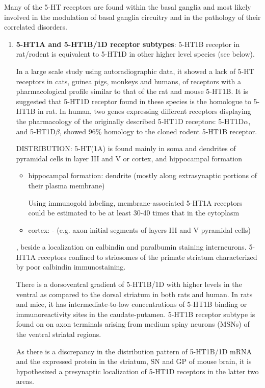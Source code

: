 Many of the 5-HT receptors are found within the basal ganglia and most likely
involved in the modulation of basal ganglia circuitry and in the pathology of
their correlated disorders.
\begin{enumerate}
  \item  {\bf 5-HT1A and 5-HT1B/1D receptor subtypes}: 5-HT1B receptor in
  rat/rodent is equivalent to 5-HT1D in other higher level species (see below).

In a large scale study using autoradiographic data, it showed a lack of 5-HT
receptors in cats, guinea pigs, monkeys and humans, of receptors with a
pharmacological profile similar to that of the rat and mouse 5-HT1B.
It is suggested that 5-HT1D receptor found in these species is the homologue to
5-HT1B in rat. In human, two genes expressing different receptors displaying the
pharmacology of the originally described 5-HT1D receptors: 5-HT1D$\alpha$, and
5-HT1D$\beta$, showed 96\% homology to the cloned rodent 5-HT1B receptor.


DISTRIBUTION:   5-HT(1A) is found mainly in soma and dendrites of pyramidal
cells in layer III and V or cortex, and hippocampal formation
  \begin{itemize}
    \item hippocampal formation: dendrite (mostly along extrasynaptic portions
    of their plasma membrane)
    
 Using immunogold labeling, membrane-associated 5-HT1A receptors could be
 estimated to be at least 30-40 times that in the cytoplasm
    
    \item cortex: -  (e.g. axon  initial segments of layers III and V pyramidal cells)
  \end{itemize}
,  beside a localization on calbindin and paralbumin staining interneurons.
5-HT1A receptors confined to striosomes of the primate striatum characterized by
poor calbindin immunostaining.

There is a dorsoventral gradient of 5-HT1B/1D with higher levels in the ventral as
compared to the dorsal striatum in both rats and human. In rats and mice, it has
intermediate-to-low concentrations of 5-HT1B binding or immunoreactivity sites in the caudate-putamen.
5-HT1B receptor subtype is found on on axon terminals arising from medium spiny
neurons (MSNs) of the ventral striatal regions.

As there is a discrepancy in the distribution pattern of 5-HT1B/1D mRNA and the
expressed protein in the striatum, SN and GP of mouse brain, it is hypothesized 
a presynaptic localization of 5-HT1D receptors in the
latter two areas.


\end{enumerate}
